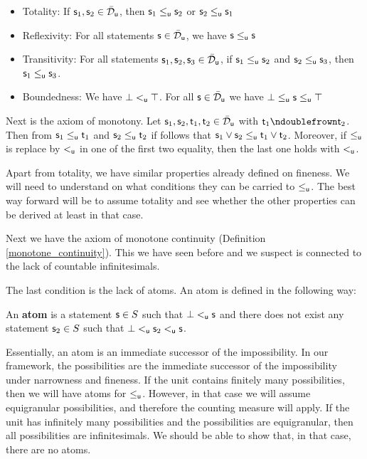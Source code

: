 \documentclass[10pt, onecolumn, longbibliography, nofootinbib]{revtex4-2}
\begin{document}
\begin{itemize}
	\item Totality: If $\stmt_1,\stmt_2\in \tdomain_{\stmt[u]}$, then $\stmt_1 \lequ \stmt_2$ or $\stmt_2 \lequ \stmt_1$
	\item Reflexivity: For all statements $\stmt\in \tdomain_{\stmt[u]}$, we have $\stmt\lequ\stmt$
	\item Transitivity: For all statements $\stmt_1,\stmt_2,\stmt_3\in \tdomain_{\stmt[u]}$, if $\stmt_1\lequ\stmt_2$ and $\stmt_2\lequ\stmt_3$, then $\stmt_1\lequ\stmt_3$.
	\item Boundedness: We have $\impossibility\ltu\certainty$. For all $\stmt\in \tdomain_{\stmt[u]}$ we have $\impossibility\leq_{\stmt[u]}\stmt\lequ\certainty$
\end{itemize}

Next is the axiom of monotony. Let $\stmt_1,\stmt_2,\stmt[t]_1,\stmt[t]_2 \in \tdomain_{\stmt[u]}$ with $\stmt[t]_1 \ncomp \stmt[t]_2$. Then from $\stmt_1 \lequ \stmt[t]_1$ and $\stmt_2 \lequ \stmt[t]_2$ if follows that $\stmt_1\OR \stmt_2 \lequ \stmt[t]_1\OR \stmt[t]_2$. Moreover, if $\lequ$ is replace by $\ltu$ in one of the first two equality, then the last one holds with $\ltu$.

Apart from totality, we have similar properties already defined on fineness. We will need to understand on what conditions they can be carried to $\lequ$. The best way forward will be to assume totality and see whether the other properties can be derived at least in that case.

Next we have the axiom of monotone continuity (Definition \ref{monotone_continuity}). This we have seen before and we suspect is connected to the lack of countable infinitesimals.

The last condition is the lack of atoms. An atom is defined in the following way:

\begin{defn}
An \textbf{atom} is a statement $\stmt\in S$ such that $\impossibility \ltu \stmt$ and there does not exist any statement $\stmt_2\in S$ such that $\impossibility \ltu \stmt_2 \ltu \stmt$. 
\end{defn}

Essentially, an atom is an immediate successor of the impossibility. In our framework, the possibilities are the immediate successor of the impossibility under narrowness and fineness. If the unit contains finitely many possibilities, then we will have atoms for $\lequ$. However, in that case we will assume equigranular possibilities, and therefore the counting measure will apply. If the unit has infinitely many possibilities and the possibilities are equigranular, then all possibilities are infinitesimals. We should be able to show that, in that case, there are no atoms.
\end{document}
